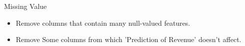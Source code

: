 \documentclass[
 size=12pt,
 paper=smartboard,  %
 mode=present, 		%
 display=slides, 	%
 style=tuliplab,  	%
 pauseslide,
 fleqn,leqno]{powerdot}
\begin{document}
\begin{slide}{Missing Value}
  \begin{itemize}
    \item
    Remove columns that contain many null-valued features. 
    \item 
    Remove Some columns from which 'Prediction of Revenue' doesn't affect. 
  \end{itemize}
  \vspace{0.75cm}



\end{slide}
\end{document}
